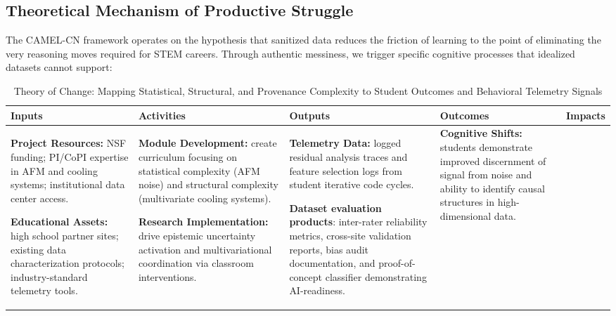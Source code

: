\documentclass[11pt]{article}
\begin{document}
\subsection{Theoretical Mechanism of Productive Struggle} 
The CAMEL-CN framework operates on the hypothesis that sanitized data reduces the friction of learning to the point of eliminating the very reasoning moves required for STEM careers.
Through authentic messiness, we trigger specific cognitive processes that idealized datasets cannot support:
\begin{table}[H]
    \centering
    \footnotesize 
    \caption{Theory of Change: Mapping Statistical, Structural, and Provenance Complexity to Student Outcomes and Behavioral Telemetry Signals}
    \vspace{-0.2cm}
    \label{tab:complexity_toc} 
    \renewcommand{\arraystretch}{1.4} 
    
    \begin{tabularx}{\textwidth}{|X|X|X|X|X|}
        \hline
        \rowcolor{mycmykcolor}
        \textbf{Inputs} & \textbf{Activities} & \textbf{Outputs} & \textbf{Outcomes} & \textbf{Impacts} \\
        \hline
        
        \textbf{Project Resources:} NSF funding; PI/CoPI expertise in AFM and cooling systems; institutional data center access. 
        
        \vspace{0.2cm} 
        
        \textbf{Educational Assets:} high school partner sites; existing data characterization protocols; industry-standard telemetry tools.
        & 
        \textbf{Module Development:} create curriculum focusing on statistical complexity (AFM noise) and structural complexity (multivariate cooling systems).
        
        \vspace{0.2cm}
        
        \textbf{Research Implementation:} drive epistemic uncertainty activation \cite{carvour2013teaching} and multivariational coordination \cite{Toprak04032026} via classroom interventions.
        & 

        \textbf{Telemetry Data:} logged residual analysis traces and feature selection logs from student iterative code cycles.

        \vspace{0.2cm}
        \textbf{Dataset evaluation products}: inter-rater reliability metrics, cross-site validation reports, bias audit documentation, and proof-of-concept classifier demonstrating AI-readiness.
        & 
        \textbf{Cognitive Shifts:} students demonstrate improved discernment of signal from noise and ability to identify causal structures in high-dimensional data.
        

\end{tabularx}
\end{table}
\end{document}
